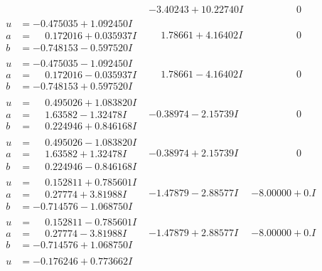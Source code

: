 \documentclass[1p]{elsarticle_modified}
\theoremstyle{definition}
\begin{document}
$$\begin{array}{c|c|c}
 & -3.40243 + 10.22740 I & \phantom{-0.000000 } 0 \\ \hline\begin{aligned}
u &= -0.475035 + 1.092450 I \\
a &= \phantom{-}0.172016 + 0.035937 I \\
b &= -0.748153 - 0.597520 I\end{aligned}
 & \phantom{-}1.78661 + 4.16402 I & \phantom{-0.000000 } 0 \\ \hline\begin{aligned}
u &= -0.475035 - 1.092450 I \\
a &= \phantom{-}0.172016 - 0.035937 I \\
b &= -0.748153 + 0.597520 I\end{aligned}
 & \phantom{-}1.78661 - 4.16402 I & \phantom{-0.000000 } 0 \\ \hline\begin{aligned}
u &= \phantom{-}0.495026 + 1.083820 I \\
a &= \phantom{-}1.63582 - 1.32478 I \\
b &= \phantom{-}0.224946 + 0.846168 I\end{aligned}
 & -0.38974 - 2.15739 I & \phantom{-0.000000 } 0 \\ \hline\begin{aligned}
u &= \phantom{-}0.495026 - 1.083820 I \\
a &= \phantom{-}1.63582 + 1.32478 I \\
b &= \phantom{-}0.224946 - 0.846168 I\end{aligned}
 & -0.38974 + 2.15739 I & \phantom{-0.000000 } 0 \\ \hline\begin{aligned}
u &= \phantom{-}0.152811 + 0.785601 I \\
a &= \phantom{-}0.27774 + 3.81988 I \\
b &= -0.714576 - 1.068750 I\end{aligned}
 & -1.47879 - 2.88577 I & -8.00000 + 0. I\phantom{ +0.000000I} \\ \hline\begin{aligned}
u &= \phantom{-}0.152811 - 0.785601 I \\
a &= \phantom{-}0.27774 - 3.81988 I \\
b &= -0.714576 + 1.068750 I\end{aligned}
 & -1.47879 + 2.88577 I & -8.00000 + 0. I\phantom{ +0.000000I} \\ \hline\begin{aligned}
u &= -0.176246 + 0.773662 I \\

\end{aligned}
\end{array}$$
\end{document}

